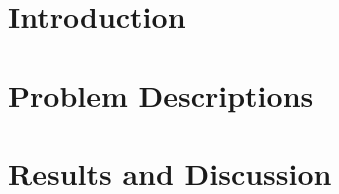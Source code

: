 \documentclass[titlepage, a4paper, 11pt]{article}
\begin{document}


\tableofcontents
\newpage
\listoffigures
\listoftables
\newpage

\section{Introduction}




\newpage

\section{Problem Descriptions}










\section{Results and Discussion}










\printbibliography
\end{document}
